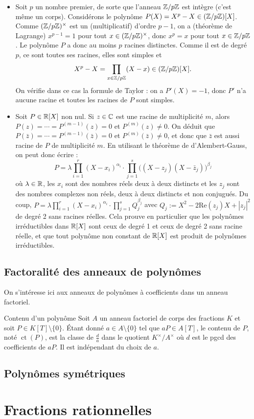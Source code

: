 \documentclass[]{report}
\begin{document}
\begin{ex}{}{}
    \begin{itemize}
        \item Soit $p$ un nombre premier, de sorte que l'anneau $\mathbb{Z}/p\mathbb{Z}$ est intègre (c'est même un corps). Considérons le polynôme $P(X) = X^p - X \in (\mathbb{Z}/p\mathbb{Z})[X]$. Comme $(\mathbb{Z}/p\mathbb{Z})^{\times}$ est un \gr (multiplicatif) d'ordre $p - 1$, on a (théorème de Lagrange) $x^{p-1} = 1$ pour tout $x \in (\mathbb{Z}/p\mathbb{Z})^{\times}$, donc $x^p = x$ pour tout $x \in \mathbb{Z}/p\mathbb{Z}$. Le polynôme $P$ a donc au moins $p$ racines distinctes. Comme il est de degré $p$, ce sont toutes ses racines, elles sont simples et
    \[X^p - X = \prod_{x \in \mathbb{Z}/p\mathbb{Z}}(X - x) \in (\mathbb{Z}/p\mathbb{Z})[X].\]
    On vérifie dans ce cas la formule de Taylor : on a $P'(X) = -1$, donc $P'$ n'a aucune racine et toutes les racines de $P$ sont simples.
        \item Soit $P \in \mathbb{R}[X]$ non nul. Si $z \in \mathbb{C}$ est une racine de multiplicité $m$, alors $P(z) = \cdots = P^{(m-1)}(z) = 0$ et $P^{(m)}(z) \neq 0$. On déduit que $P(\bar{z}) = \cdots = P^{(m-1)}(\bar{z}) = 0$ et $P^{(m)}(\bar{z}) \neq 0$, et donc que $\bar{z}$ est aussi racine de $P$ de multiplicité $m$. En utilisant le théorème de d'Alembert-Gauss, on peut donc écrire :
    \[P = \lambda \prod_{i = 1}^{r}(X - x_i)^{\alpha_i} \cdot \prod_{j = 1}^{s}\big((X - z_j)(X - \bar{z}_j)\big)^{\beta_j}\]
    où $\lambda \in \mathbb{R}$, les $x_i$ sont des nombres réels deux à deux distincts et les $z_j$ sont des nombres complexes non réels, deux à deux distincts et non conjugués. Du coup, $P = \lambda \prod_{i=1}^{r}(X - x_i)^{\alpha_i} \cdot \prod_{j=1}^{s}Q_j^{\beta_j}$ avec $Q_j := X^2 - 2\mathrm{Re}(z_j)X + |z_j|^2$ de degré 2 sans racines réelles. Cela prouve en particulier que les polynômes irréductibles dans $\mathbb{R}[X]$ sont ceux de degré 1 et ceux de degré 2 sans racine réelle, et que tout polynôme non constant de $\mathbb{R}[X]$ est produit de polynômes irréductibles.
    \end{itemize}
\end{ex}

\subsection{Factoralité des anneaux de polynômes}

On s'intéresse ici aux anneaux de polynômes à coefficients dans un anneau factoriel.

\begin{df}{Contenu d'un polynôme}{}
    Soit $A$ un anneau factoriel de corps des fractions $K$ et soit $P \in K[T] \setminus \{0\}$. Étant donné $a \in A \setminus \{0\}$ tel que $aP \in A[T]$, le contenu de $P$, noté $\operatorname{ct}(P)$, est la classe de $\frac{d}{a}$ dans le quotient $K^{\times}/A^{\times}$ où $d$ est le pgcd des coefficients de $aP$. Il est indépendant du choix de $a$.
\end{df}

\subsection{Polynômes symétriques}

\section{Fractions rationnelles}
\end{document}
